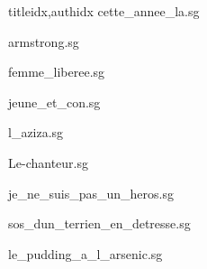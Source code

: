 \documentclass[12pt]{article}
\begin{document}
\begin{songs}{titleidx,authidx}
{cette_annee_la.sg}


{armstrong.sg}


{femme_liberee.sg}


{jeune_et_con.sg}


{l_aziza.sg}


{Le-chanteur.sg}


{je_ne_suis_pas_un_heros.sg}


{sos_dun_terrien_en_detresse.sg}


{le_pudding_a_l_arsenic.sg}



\end{songs}
\end{document}
